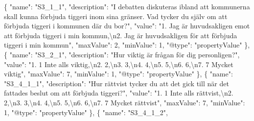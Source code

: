\documentclass[
]{book}
\newenvironment{Shaded}{\begin{snugshade}}{\end{snugshade}}
\newcommand{\CharTok}[1]{\textcolor[rgb]{0.31,0.60,0.02}{#1}}
\newcommand{\DataTypeTok}[1]{\textcolor[rgb]{0.13,0.29,0.53}{#1}}
\newcommand{\DecValTok}[1]{\textcolor[rgb]{0.00,0.00,0.81}{#1}}
\newcommand{\FunctionTok}[1]{\textcolor[rgb]{0.00,0.00,0.00}{#1}}
\newcommand{\OtherTok}[1]{\textcolor[rgb]{0.56,0.35,0.01}{#1}}
\newcommand{\StringTok}[1]{\textcolor[rgb]{0.31,0.60,0.02}{#1}}
\begin{document}
\begin{Shaded}
\begin{Highlighting}[]
    \FunctionTok{\{}
      \DataTypeTok{"name"}\FunctionTok{:} \StringTok{"S3_1_1"}\FunctionTok{,}
      \DataTypeTok{"description"}\FunctionTok{:} \StringTok{"I debatten diskuteras ibland att kommunerna skall kunna förbjuda tiggeri inom sina gränser. Vad tycker du själv om att förbjuda tiggeri i kommunen där du bor?"}\FunctionTok{,}
      \DataTypeTok{"value"}\FunctionTok{:} \StringTok{"1. Jag är huvudsakligen emot att förbjuda tiggeri i min kommun,}\CharTok{\textbackslash{}n}\StringTok{2. Jag är huvudsakligen för att förbjuda tiggeri i min kommun"}\FunctionTok{,}
      \DataTypeTok{"maxValue"}\FunctionTok{:} \DecValTok{2}\FunctionTok{,}
      \DataTypeTok{"minValue"}\FunctionTok{:} \DecValTok{1}\FunctionTok{,}
      \DataTypeTok{"@type"}\FunctionTok{:} \StringTok{"propertyValue"}
    \FunctionTok{\}}\OtherTok{,}
    \FunctionTok{\{}
      \DataTypeTok{"name"}\FunctionTok{:} \StringTok{"S3_2_1"}\FunctionTok{,}
      \DataTypeTok{"description"}\FunctionTok{:} \StringTok{"Hur viktig är frågan för dig personligen?"}\FunctionTok{,}
      \DataTypeTok{"value"}\FunctionTok{:} \StringTok{"1. 1 Inte alls viktig,}\CharTok{\textbackslash{}n}\StringTok{2. 2,}\CharTok{\textbackslash{}n}\StringTok{3. 3,}\CharTok{\textbackslash{}n}\StringTok{4. 4,}\CharTok{\textbackslash{}n}\StringTok{5. 5,}\CharTok{\textbackslash{}n}\StringTok{6. 6,}\CharTok{\textbackslash{}n}\StringTok{7. 7 Mycket viktig"}\FunctionTok{,}
      \DataTypeTok{"maxValue"}\FunctionTok{:} \DecValTok{7}\FunctionTok{,}
      \DataTypeTok{"minValue"}\FunctionTok{:} \DecValTok{1}\FunctionTok{,}
      \DataTypeTok{"@type"}\FunctionTok{:} \StringTok{"propertyValue"}
    \FunctionTok{\}}\OtherTok{,}
    \FunctionTok{\{}
      \DataTypeTok{"name"}\FunctionTok{:} \StringTok{"S3_4_1_1"}\FunctionTok{,}
      \DataTypeTok{"description"}\FunctionTok{:} \StringTok{"Hur rättvist tycker du att det gick till när det fattades beslut om att förbjuda tiggeri?"}\FunctionTok{,}
      \DataTypeTok{"value"}\FunctionTok{:} \StringTok{"1. 1 Inte alls rättvist,}\CharTok{\textbackslash{}n}\StringTok{2. 2,}\CharTok{\textbackslash{}n}\StringTok{3. 3,}\CharTok{\textbackslash{}n}\StringTok{4. 4,}\CharTok{\textbackslash{}n}\StringTok{5. 5,}\CharTok{\textbackslash{}n}\StringTok{6. 6,}\CharTok{\textbackslash{}n}\StringTok{7. 7 Mycket rättvist"}\FunctionTok{,}
      \DataTypeTok{"maxValue"}\FunctionTok{:} \DecValTok{7}\FunctionTok{,}
      \DataTypeTok{"minValue"}\FunctionTok{:} \DecValTok{1}\FunctionTok{,}
      \DataTypeTok{"@type"}\FunctionTok{:} \StringTok{"propertyValue"}
    \FunctionTok{\}}\OtherTok{,}
    \FunctionTok{\{}
      \DataTypeTok{"name"}\FunctionTok{:} \StringTok{"S3_4_1_2"}\FunctionTok{,}

\end{Highlighting}
\end{Shaded}
\end{document}
